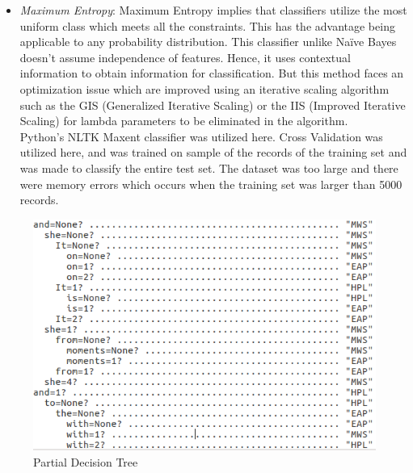 \documentclass[fleqn,10pt]{SelfArx} %
\begin{document}
\begin{itemize}[noitemsep]
\item \textit{Maximum Entropy}: Maximum Entropy implies that classifiers utilize the most uniform class which meets all the constraints. This has the advantage being applicable to any probability distribution. This classifier unlike Naïve Bayes doesn’t assume independence of features.  Hence, it uses contextual information to obtain information for classification. But this method faces an optimization issue which are improved using an iterative scaling algorithm such as the GIS (Generalized Iterative Scaling) or the IIS (Improved Iterative Scaling) for lambda parameters to be eliminated in the algorithm.\\
Python’s NLTK Maxent classifier was utilized here. Cross Validation was utilized here, and was trained on sample of the records of the training set and was made to classify the entire test set. The dataset was too large and there were memory errors which occurs when the training set was larger than 5000 records. 

\end{itemize}
\begin{figure}[ht]
	\begin{minipage}{0.24\textwidth}
		\includegraphics[width=2.0\linewidth]{author/decision_tree.PNG}
	\end{minipage}%
	\caption{Partial Decision Tree}
\end{figure}
\end{document}
